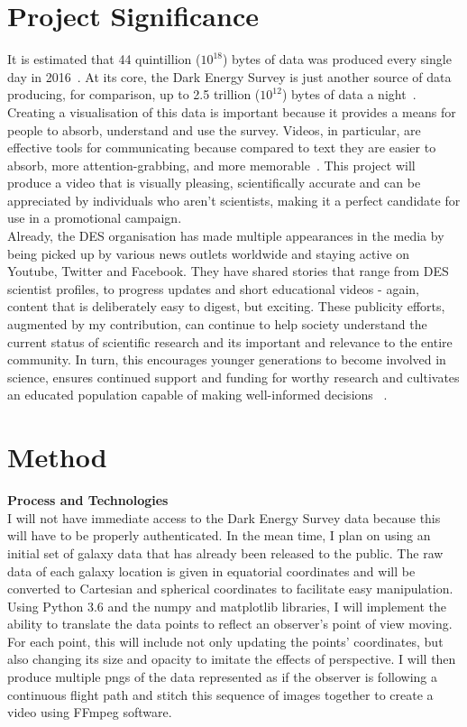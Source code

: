\documentclass[pra, reprint, A4 paper, bibnotes]{revtex4-1}
\begin{document}
\section{Project Significance}
It is estimated that 44 quintillion ($10^{18}$) bytes of data was produced every single day in 2016~\cite{micro_focus_growth_2017}. At its core, the Dark Energy Survey is just another source of data producing, for comparison, up to 2.5 trillion ($10^{12}$) bytes of data a night~\cite{the_dark_energy_survey_survey_2018}. Creating a visualisation of this data is important because it provides a means for people to absorb, understand and use the survey. Videos, in particular, are effective tools for communicating because compared to text they are easier to absorb, more attention-grabbing, and more memorable~\cite{chan_video_2010}. This project will produce a video that is visually pleasing, scientifically accurate and can be appreciated by individuals who aren't scientists, making it a perfect candidate for use in a promotional campaign.\\

Already, the DES organisation has made multiple appearances in the media by being picked up by various news outlets worldwide and staying active on Youtube, Twitter and Facebook. They have shared stories that range from DES scientist profiles, to progress updates and short educational videos - again, content that is deliberately easy to digest, but exciting. These publicity efforts, augmented by my contribution, can continue to help society understand the current status of scientific research and its important and relevance to the entire community. In turn, this encourages younger generations to become involved in science, ensures continued support and funding for worthy research and cultivates an educated population capable of making well-informed decisions ~\cite{jucan_power_2014, julie_gould_importance_2014}. 
\section{Method}
\textbf{Process and Technologies}\\
I will not have immediate access to the Dark Energy Survey data because this will have to be properly authenticated. In the mean time, I plan on using an initial set of galaxy data that has already been released to the public. The raw data of each galaxy location is given in equatorial coordinates and will be converted to Cartesian and spherical coordinates to facilitate easy manipulation. Using Python 3.6 and the numpy and matplotlib libraries, I will implement the ability to translate the data points to reflect an observer's point of view moving. For each point, this will include not only updating the points' coordinates, but also changing its size and opacity to imitate the effects of perspective. I will then produce multiple pngs of the data represented as if the observer is following a continuous flight path and stitch this sequence of images together to create a video using FFmpeg software.\\
\end{document}
